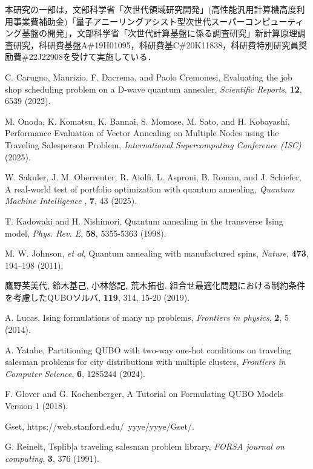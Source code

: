 \documentclass[submit,techrep,noauthor]{ipsj}
\begin{document}
\begin{acknowledgment}
本研究の一部は，文部科学省「次世代領域研究開発」(高性能汎用計算機高度利用事業費補助金)「量子アニーリングアシスト型次世代スーパーコンピューティング基盤の開発」，文部科学省「次世代計算基盤に係る調査研究」新計算原理調査研究，科研費基盤A\#19H01095，科研費基C\#20K11838，科研費特別研究員奨励費\#22J22908を受けて実施している．
\end{acknowledgment}

\begin{thebibliography}{10}

C. Carugno, Maurizio, F. Dacrema, and Paolo Cremonesi, Evaluating the job shop scheduling problem on a D-wave quantum annealer, {\it Scientific Reports}, {\bf 12}, 6539 (2022).

M. Onoda, K. Komatsu, K. Bannai, S. Momose, M. Sato, and H. Kobayashi, Performance Evaluation of Vector Annealing  on Multiple Nodes using  the Traveling Salesperson Problem, {\it International Supercomputing Conference (ISC)} (2025).

W. Sakuler, J. M. Oberreuter, R. Aiolfi, L. Asproni, B. Roman, and J. Schiefer, A real-world test of portfolio optimization with quantum annealing, {\it Quantum Machine Intelligence }, {\bf 7}, 43 (2025).

T. Kadowaki and H. Nishimori, Quantum annealing in the transverse Ising model, {\it Phys. Rev. E}, {\bf 58}, 5355-5363 (1998).

M. W. Johnson, {\it et al}, Quantum annealing with manufactured spins, {\it Nature}, {\bf 473}, 194–198 (2011).

鷹野芙美代, 鈴木基己, 小林悠記, 荒木拓也. 組合せ最適化問題における制約条件を考慮したQUBOソルバ, {\bf 119}, 314, 15-20 (2019).

A. Lucas, Ising formulations of many np problems, {\it Frontiers in physics}, {\bf 2}, 5 (2014).

A. Yatabe, Partitioning QUBO with two-way one-hot conditions on traveling salesman problems for city distributions with multiple clusters, {\it Frontiers in Computer Science}, {\bf 6}, 1285244 (2024).

F. Glover and G. Kochenberger, A Tutorial on Formulating QUBO Models Version 1 (2018).

Gset, https://web.stanford.edu/~yyye/yyye/Gset/.

G. Reinelt, Tsplib|a traveling salesman problem library, {\it FORSA journal on computing}, {\bf 3}, 376 (1991).


\end{thebibliography}
\end{document}
